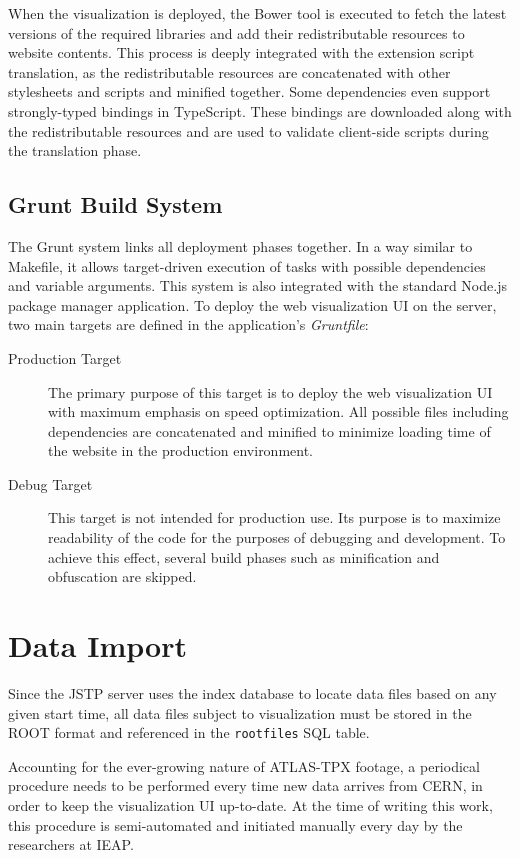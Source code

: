When the visualization is deployed, the Bower tool is executed to fetch the latest versions of the required libraries and add their redistributable resources to website contents. This process is deeply integrated with the extension script translation, as the redistributable resources are concatenated with other stylesheets and scripts and minified together. Some dependencies even support strongly-typed bindings in TypeScript. These bindings are downloaded along with the redistributable resources and are used to validate client-side scripts during the translation phase.

\subsection{Grunt Build System}
The Grunt system links all deployment phases together. In a way similar to Makefile, it allows target-driven execution of tasks with possible dependencies and variable arguments. This system is also integrated with the standard Node.js package manager application. To deploy the web visualization UI on the server, two main targets are defined in the application's \textit{Gruntfile}:

\begin{description}
	\item[Production Target]
	The primary purpose of this target is to deploy the web visualization UI with maximum emphasis on speed optimization. All possible files including dependencies are concatenated and minified to minimize loading time of the website in the production environment.

	\item[Debug Target]
	This target is not intended for production use. Its purpose is to maximize readability of the code for the purposes of debugging and development. To achieve this effect, several build phases such as minification and obfuscation are skipped.
\end{description}

\section{Data Import}
Since the JSTP server uses the index database to locate data files based on any given start time, all data files subject to visualization must be stored in the ROOT format and referenced in the \texttt{rootfiles} SQL table.

Accounting for the ever-growing nature of ATLAS-TPX footage, a periodical procedure needs to be performed every time new data arrives from CERN, in order to keep the visualization UI up-to-date. At the time of writing this work, this procedure is semi-automated and initiated manually every day by the researchers at IEAP.

